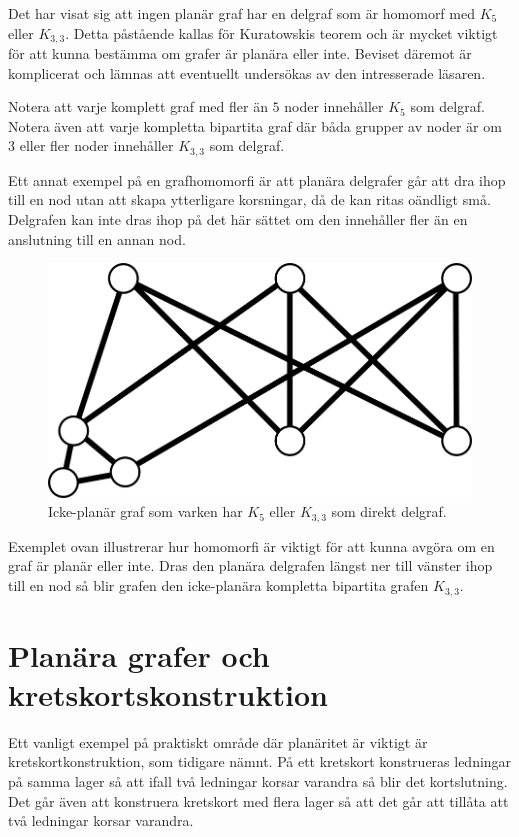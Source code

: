 \documentclass[a4paper,11pt]{article}
\begin{document}
Det har visat sig att ingen planär graf har en delgraf som är homomorf med $K_{5}$ eller $K_{3,3}$.
Detta påstående kallas för Kuratowskis teorem och är mycket viktigt för att kunna bestämma om grafer är planära eller inte. 
Beviset däremot är komplicerat och lämnas att eventuellt undersökas av den intresserade läsaren.

Notera att varje komplett graf med fler än $5$ noder innehåller $K_5$ som delgraf. Notera även att varje kompletta bipartita graf där båda grupper av noder är om 3 eller fler noder innehåller $K_{3,3}$ som delgraf.

Ett annat exempel på en grafhomomorfi är att planära delgrafer går att dra ihop till en nod utan att skapa ytterligare korsningar, då de kan ritas oändligt små. Delgrafen kan inte dras ihop på det här sättet om den innehåller fler än en anslutning till en annan nod.

\begin{figure}[!ht]
	\begin{center}
		\includegraphics{fig9}
		\caption{Icke-planär graf som varken har $K_5$ eller $K_{3,3}$ som direkt delgraf.}
		\label{fig9}
	\end{center}
\end{figure}
\FloatBarrier

Exemplet ovan illustrerar hur homomorfi är viktigt för att kunna avgöra om en graf är planär eller inte. Dras den planära delgrafen längst ner till vänster ihop till en nod så blir grafen den icke-planära kompletta bipartita grafen $K_{3,3}$.

\section*{Planära grafer och kretskortskonstruktion}

Ett vanligt exempel på praktiskt område där planäritet är viktigt är kretskortkonstruktion, som tidigare nämnt. På ett kretskort konstrueras ledningar på samma lager så att ifall två ledningar korsar varandra så blir det kortslutning. Det går även att konstruera kretskort med flera lager så att det går att tillåta att två ledningar korsar varandra.
\end{document}
